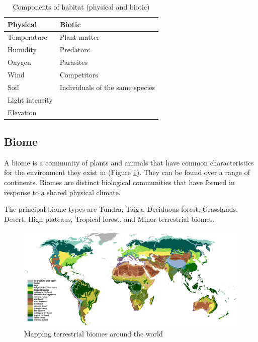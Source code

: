 \documentclass[]{book}
\begin{document}
\begin{table}

\caption{\label{tab:habitat}Components of habitat (physical and biotic)}
\centering
\begin{tabular}[t]{ll}
\toprule
Physical & Biotic\\
\midrule
Temperature & Plant matter\\
Humidity & Predators\\
Oxygen & Parasites\\
Wind & Competitors\\
Soil & Individuals of the same species\\
\addlinespace
Light intensity & \\
Elevation & \\
\bottomrule
\end{tabular}
\end{table}

\hypertarget{biome}{%
\subsection{Biome}\label{biome}}

A biome is a community of plants and animals that have common characteristics for the environment they exist in (Figure \ref{fig:biomes}). They can be found over a range of continents. Biomes are distinct biological communities that have formed in response to a shared physical climate.

The principal biome-types are Tundra, Taiga, Deciduous forest, Grasslands, Desert, High plateaus, Tropical forest, and Minor terrestrial biomes.

\begin{figure}

{\centering \includegraphics[width=1\linewidth]{figures/biomes} 

}

\caption{Mapping terrestrial biomes around the world}\label{fig:biomes}
\end{figure}
\end{document}
